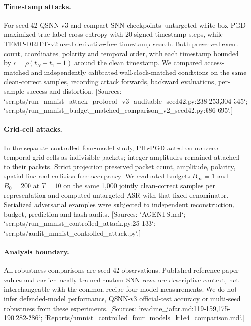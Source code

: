 \paragraph{Timestamp attacks.} For seed-42 QSNN-v3 and compact SNN checkpoints, untargeted white-box PGD maximized true-label cross entropy with 20 signed timestamp steps, while TEMP-DRIFT-v2 used derivative-free timestamp search. Both preserved event count, coordinates, polarity and temporal order, with each timestamp bounded by $\epsilon=\rho(t_N-t_1+1)$ around the clean timestamp. We compared access-matched and independently calibrated wall-clock-matched conditions on the same clean-correct samples, recording attack forwards, backward evaluations, per-sample success and distortion. [Sources: `scripts/run_nmnist_attack_protocol_v3_auditable_seed42.py:238-253,304-345`; `scripts/run_nmnist_budget_matched_comparison_v2_seed42.py:686-695`.]

\paragraph{Grid-cell attacks.} In the separate controlled four-model study, PIL-PGD acted on nonzero temporal-grid cells as indivisible packets; integer amplitudes remained attached to their packets. Strict projection preserved packet count, amplitude, polarity, spatial line and collision-free occupancy. We evaluated budgets $B_\infty=1$ and $B_0=200$ at $T=10$ on the same 1,000 jointly clean-correct samples per representation and computed untargeted ASR with that fixed denominator. Serialized adversarial examples were subjected to independent reconstruction, budget, prediction and hash audits. [Sources: `AGENTS.md`; `scripts/run_nmnist_controlled_attack.py:25-133`; `scripts/audit_nmnist_controlled_attack.py`.]

\paragraph{Analysis boundary.} All robustness comparisons are seed-42 observations. Published reference-paper values and earlier locally trained custom-SNN rows are descriptive context, not interchangeable with the common-recipe four-model measurements. We do not infer defended-model performance, QSNN-v3 official-test accuracy or multi-seed robustness from these experiments. [Sources: `readme_jafar.md:119-159,175-190,282-286`; `Reports/nmnist_controlled_four_models_lr1e4_comparison.md`.]
